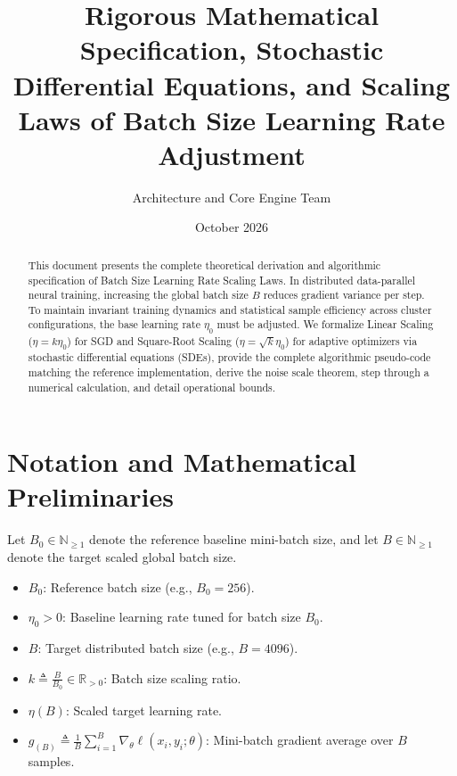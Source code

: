 \documentclass[11pt,a4paper]{article}
\title{\textbf{Rigorous Mathematical Specification, Stochastic Differential Equations, and Scaling Laws of Batch Size Learning Rate Adjustment}}
\author{Architecture and Core Engine Team}
\date{October 2026}
\theoremstyle{definition}
\begin{document}
\maketitle

\begin{abstract}
This document presents the complete theoretical derivation and algorithmic specification of Batch Size Learning Rate Scaling Laws. In distributed data-parallel neural training, increasing the global batch size $B$ reduces gradient variance per step. To maintain invariant training dynamics and statistical sample efficiency across cluster configurations, the base learning rate $\eta_0$ must be adjusted. We formalize Linear Scaling ($\eta = k \eta_0$) for SGD and Square-Root Scaling ($\eta = \sqrt{k} \eta_0$) for adaptive optimizers via stochastic differential equations (SDEs), provide the complete algorithmic pseudo-code matching the reference implementation, derive the noise scale theorem, step through a numerical calculation, and detail operational bounds.
\end{abstract}

\section{Notation and Mathematical Preliminaries}

Let $B_0 \in \mathbb{N}_{\ge 1}$ denote the reference baseline mini-batch size, and let $B \in \mathbb{N}_{\ge 1}$ denote the target scaled global batch size.

\begin{itemize}
    \item $B_0$: Reference batch size (e.g., $B_0 = 256$).
    \item $\eta_0 > 0$: Baseline learning rate tuned for batch size $B_0$.
    \item $B$: Target distributed batch size (e.g., $B = 4096$).
    \item $k \triangleq \frac{B}{B_0} \in \mathbb{R}_{> 0}$: Batch size scaling ratio.
    \item $\eta(B)$: Scaled target learning rate.
    \item $g_{(B)} \triangleq \frac{1}{B} \sum_{i=1}^B \nabla_\theta \ell(x_i, y_i; \theta)$: Mini-batch gradient average over $B$ samples.
\end{itemize}
\end{document}
